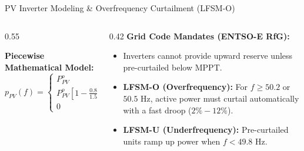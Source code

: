 \begin{frame}{PV Inverter Modeling \& Overfrequency Curtailment (LFSM-O)}
\begin{columns}[T]
\begin{column}{0.55\textwidth}
    \scriptsize
    \textbf{Piecewise Mathematical Model:}
    \begin{equation*}
        p_{PV}(f) = \begin{cases}
            P_{PV}^o & \text{if } f < 50.5\text{ Hz} \\
            P_{PV}^o \left[ 1 - \frac{0.8}{1.5}(f - 50.5) \right] & \text{if } 50.5 \le f < 52.0\text{ Hz} \\
            0 & \text{if } f \ge 52.0\text{ Hz}
        \end{cases}
    \end{equation*}
\end{column}
\begin{column}{0.42\textwidth}
    \scriptsize
    \textbf{Grid Code Mandates (ENTSO-E RfG):}
    \begin{itemize}\setlength{\itemsep}{2pt}
        \item Inverters cannot provide upward reserve unless pre-curtailed below MPPT.
        \item \textbf{LFSM-O (Overfrequency):} For $f \ge 50.2$ or $50.5\text{ Hz}$, active power must curtail automatically with a fast droop ($2\% - 12\%$).
        \item \textbf{LFSM-U (Underfrequency):} Pre-curtailed units ramp up power when $f < 49.8\text{ Hz}$.
    \end{itemize}
    \vspace{0.15cm}
    \href{https://github.com/bcornelusse/ELEC0447-analysis-power-systems/blob/master/Lectures/frequency_control/frequency_control_simulation.ipynb}{}
\end{column}
\end{columns}
\end{frame}

